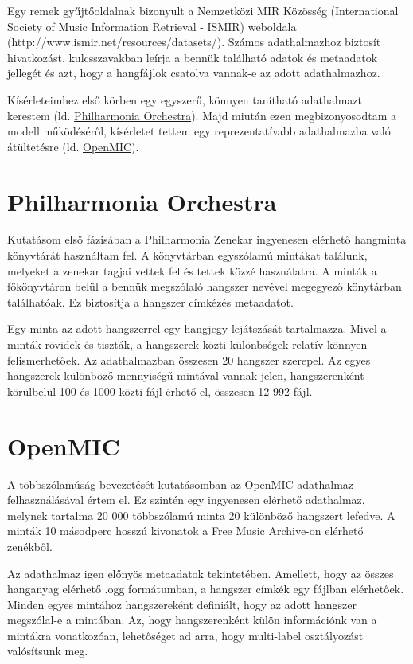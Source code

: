 Egy remek gyűjtőoldalnak bizonyult a Nemzetközi MIR Közösség (International Society of Music Information Retrieval - ISMIR) weboldala (http://www.ismir.net/resources/datasets/). Számos adathalmazhoz biztosít hivatkozást, kulcsszavakban leírja a bennük található adatok és metaadatok jellegét és azt, hogy a hangfájlok csatolva vannak-e az adott adathalmazhoz.

Kísérleteimhez első körben egy egyszerű, könnyen tanítható adathalmazt kerestem (ld. \hyperref[sec:Philharmonia]{Philharmonia Orchestra}). Majd miután ezen megbizonyosodtam a modell működéséről, kísérletet tettem egy reprezentatívabb adathalmazba való átültetésre (ld. \hyperref[sec:OpenMIC]{OpenMIC}).

\section{Philharmonia Orchestra}
\label{sec:Philharmonia}

Kutatásom első fázisában a Philharmonia Zenekar ingyenesen elérhető hangminta könyvtárát használtam fel. A könyvtárban egyszólamú mintákat találunk, melyeket a zenekar tagjai vettek fel és tettek közzé használatra. A minták a főkönyvtáron belül a bennük megszólaló hangszer nevével megegyező könytárban találhatóak. Ez biztosítja a hangszer címkézés metaadatot.

Egy minta az adott hangszerrel egy hangjegy lejátszását tartalmazza. Mivel a minták rövidek és tiszták, a hangszerek közti különbségek relatív könnyen felismerhetőek. Az adathalmazban összesen 20 hangszer szerepel. Az egyes hangszerek különböző mennyiségű mintával vannak jelen, hangszerenként körülbelül 100 és 1000 közti fájl érhető el, összesen 12 992 fájl.

\section{OpenMIC}
\label{sec:OpenMIC}

A többszólamúság bevezetését kutatásomban az OpenMIC \cite{humphrey2018openmic} adathalmaz felhasználásával értem el. Ez szintén egy ingyenesen elérhető adathalmaz, melynek tartalma 20 000 többszólamú minta 20 különböző hangszert lefedve. A minták 10 másodperc hosszú kivonatok a Free Music Archive-on \cite{fma2016} elérhető zenékből. \cite{humphrey2018openmic}

Az adathalmaz igen előnyös metaadatok tekintetében. Amellett, hogy az összes hanganyag elérhető .ogg formátumban, a hangszer címkék egy fájlban elérhetőek. Minden egyes mintához hangszereként definiált, hogy az adott hangszer megszólal-e a mintában. Az, hogy hangszerenként külön információnk van a mintákra vonatkozóan, lehetőséget ad arra, hogy multi-label osztályozást valósítsunk meg. \cite{humphrey2018openmic}

